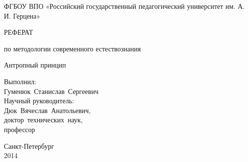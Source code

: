 \thispagestyle{empty}

\begin{center}
ФГБОУ ВПО «Российский государственный педагогический университет
им. А. И. Герцена» \par 
\par
\end{center}



\vspace{50mm}

\begin{center}
РЕФЕРАТ 

по методологии современного естествознания

Антропный принцип 

\end{center}

\vspace{20mm}
\begin{flushright}
\begin{minipage}
{0.4\textwidth} 
Выполнил:\\
Гуменюк~Станислав~Сергеевич\\ 

Научный руководитель: \\
Дюк~Вячеслав~Анатольевич,\\
доктор~технических~наук,\\
профессор\\

\end{minipage}

\end{flushright}

\vfill
\begin{center}
{Санкт-Петербург \\ 2014}
\end{center}

\newpage